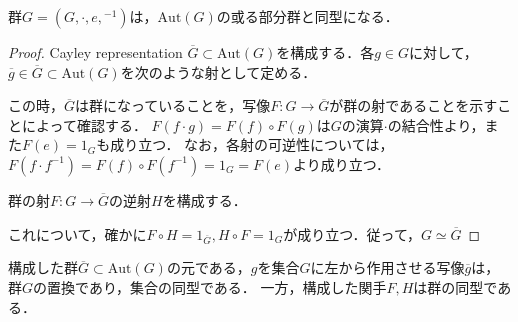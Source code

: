 \documentclass[uplatex, 12pt, dvipdfmx]{jsarticle}
\begin{document}
\begin{theorem*}[Cayley]
    群$G=(G,\cdot,e,{}^{-1})$は，$\mathrm{Aut}(G)$の或る部分群と同型になる．
\end{theorem*}
\begin{proof}
    Cayley representation $\overline{G}\subset\mathrm{Aut}(G)$を構成する．各$g\in G$に対して，$\overline{g}\in\overline{G}\subset\mathrm{Aut}(G)$を次のような射として定める．
    \begin{center}\end{center}
    この時，$\overline{G}$は群になっていることを，写像$F:G\to \overline{G}$が群の射であることを示すことによって確認する．
    $F(f\cdot g)=F(f)\circ F(g)$は$G$の演算$\cdot$の結合性より，また$F(e)=1_G$も成り立つ．
    なお，各射の可逆性については，$F(f\cdot f^{-1})=F(f)\circ F(f^{-1})=1_G=F(e)$より成り立つ．

    群の射$F:G\to \overline{G}$の逆射$H$を構成する．
    \begin{center}\end{center}
    これについて，確かに$F\circ H=1_{\overline{G}}, H\circ F=1_G$が成り立つ．従って，$G\simeq \overline{G}$
\end{proof}

\begin{remark}
    構成した群$\overline{G}\subset\mathrm{Aut}(G)$の元である，$g$を集合$G$に左から作用させる写像$\overline{g}$は，群$G$の置換であり，集合の同型である．
    一方，構成した関手$F,H$は群の同型である．
\end{remark}
\end{document}
